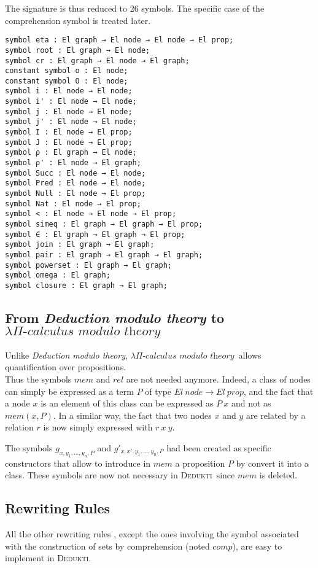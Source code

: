 \documentclass[submission,copyright,creativecommons]{eptcs}
\def\ra{\rightarrow}
\newcommand{\dedukti}{\textsc{Dedukti}}
\newcommand{\lpcm}{$\lambda \Pi\textit{-calculus modulo theory}$}
\begin{document}
The signature is thus reduced to 26 symbols. The specific case of the comprehension symbol is treated later.

\begin{lstlisting}
symbol eta : El graph → El node → El node → El prop;
symbol root : El graph → El node;
symbol cr : El graph → El node → El graph;
constant symbol o : El node;
constant symbol O : El node;
symbol i : El node → El node;
symbol i' : El node → El node;
symbol j : El node → El node;
symbol j' : El node → El node;
symbol I : El node → El prop;
symbol J : El node → El prop;
symbol ρ : El graph → El node;
symbol ρ' : El node → El graph;
symbol Succ : El node → El node;
symbol Pred : El node → El node;
symbol Null : El node → El prop;
symbol Nat : El node → El prop;
symbol < : El node → El node → El prop;
symbol simeq : El graph → El graph → El prop;
symbol ∈ : El graph → El graph → El prop;
symbol join : El graph → El graph;
symbol pair : El graph → El graph → El graph;
symbol powerset : El graph → El graph;
symbol omega : El graph;
symbol closure : El graph → El graph;
\end{lstlisting}

\subsection{From \textit{Deduction modulo theory} to \lpcm}

Unlike \textit{Deduction modulo theory}, \lpcm ~allows quantification over propositions. \\

Thus the symbols $mem$ and $rel$ \cite[see Table 2]{zermodulo} are not needed anymore. Indeed, a class of nodes can simply be expressed as a term $P$ of type $El~node \ra El~prop$, and the fact that a node $x$ is an element of this class can be expressed as $P~x$ and not as $mem(x,P)$. In a similar way, the fact that two nodes $x$ and $y$ are related by a relation $r$ is now simply expressed with $r~x~y$.

The symbols $g_{x,y_1,...,y_n,P}$ and $g'_{x,x',y_1,...,y_n,P}$ had been created as specific constructors that allow to introduce in $mem$ a proposition $P$ by convert it into a class. These symbols are now not necessary in \dedukti ~since $mem$ is deleted. 


\subsection{Rewriting Rules}

All the other rewriting rules \cite[see Table 3]{zermodulo}, except the ones involving the symbol associated with the construction of sets by comprehension (noted $comp$), are easy to implement in \dedukti.
\end{document}
